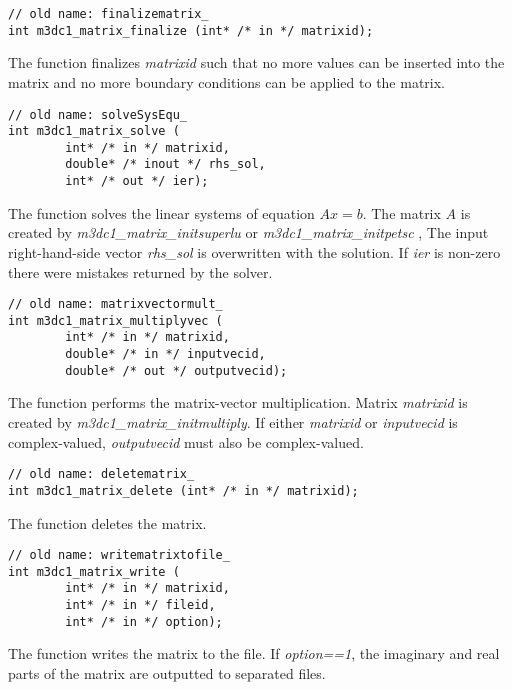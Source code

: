 \begin{verbatim}
// old name: finalizematrix_
int m3dc1_matrix_finalize (int* /* in */ matrixid); 
\end{verbatim}\vspace{-.5cm}\hspace{1cm}

The function finalizes \textit{matrixid} such that no more values can be inserted into the matrix 
	       and no more boundary conditions can be applied to the matrix.

\begin{verbatim}
// old name: solveSysEqu_
int m3dc1_matrix_solve (
        int* /* in */ matrixid, 
        double* /* inout */ rhs_sol, 
        int* /* out */ ier); 
\end{verbatim}\vspace{-.5cm}\hspace{1cm}
 
 The function solves the linear systems of equation $Ax=b$. The matrix $A$ is created by \textit{m3dc1\_matrix\_initsuperlu} or \textit{m3dc1\_matrix\_initpetsc} , 
The input right-hand-side vector \textit{rhs\_sol} is overwritten with the solution.
	       If \textit{ier} is non-zero there were mistakes returned by the solver. 
\begin{verbatim}
// old name: matrixvectormult_
int m3dc1_matrix_multiplyvec (
        int* /* in */ matrixid, 
        double* /* in */ inputvecid, 
        double* /* out */ outputvecid); 
\end{verbatim}\vspace{-.5cm}\hspace{1cm}

The function performs the matrix-vector multiplication. Matrix
\textit{matrixid} is created by \textit{m3dc1\_matrix\_initmultiply}.
	       If either \textit{matrixid} or \textit{inputvecid} is complex-valued,
	       \textit{outputvecid} must also be complex-valued.

\begin{verbatim}
// old name: deletematrix_
int m3dc1_matrix_delete (int* /* in */ matrixid); 
\end{verbatim}\vspace{-.5cm}\hspace{1cm}

The function deletes the matrix.

\begin{verbatim}
// old name: writematrixtofile_
int m3dc1_matrix_write (
        int* /* in */ matrixid, 
        int* /* in */ fileid, 
        int* /* in */ option); 
\end{verbatim}\vspace{-.5cm}\hspace{1cm}

The function writes the matrix to the file. If \textit{option==1}, the imaginary and real parts of the matrix are outputted to separated files.



